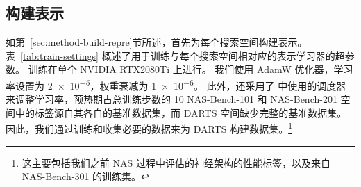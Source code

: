 \documentclass[../main_zh.tex]{subfiles}
\begin{document}
\subsection{构建表示}

如第~\ref{sec:method-build-repre}节所述，首先为每个搜索空间构建表示。
表~\ref{tab:train-settings} 概述了用于训练与每个搜索空间相对应的表示学习器的超参数。
训练在单个 NVIDIA RTX2080Ti 上进行。
我们使用 AdamW 优化器，学习率设置为 \num{2e-5}，权重衰减为 \num{1e-6}。
此外，还采用了\cite{DBLP:conf/nips/VaswaniSPUJGKP17} 中使用的调度器来调整学习率，预热期占总训练步数的 10%
NAS-Bench-101 和 NAS-Bench-201 空间中的标签源自其各自的基准数据集，而 DARTS 空间缺少完整的基准数据集。因此，我们通过训练和收集必要的数据来为 DARTS 构建数据集。\footnote{这主要包括我们之前 NAS 过程中评估的神经架构的性能标签，以及来自 NAS-Bench-301 的训练集。}
\end{document}

